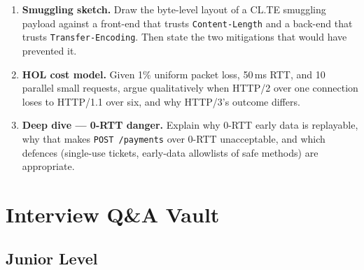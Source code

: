 \begin{enumerate}[label=\textbf{E1.\arabic*}, leftmargin=3.2em]
  \item \textbf{Smuggling sketch.} Draw the byte-level layout of a CL.TE smuggling payload against a front-end that trusts \texttt{Content-Length} and a back-end that trusts \texttt{Transfer-Encoding}. Then state the two mitigations that would have prevented it.
  \item \textbf{HOL cost model.} Given 1\% uniform packet loss, 50\,ms RTT, and 10 parallel small requests, argue qualitatively when HTTP/2 over one connection loses to HTTP/1.1 over six, and why HTTP/3's outcome differs.
  \item \textbf{Deep dive --- 0-RTT danger.} Explain why 0-RTT early data is replayable, why that makes \texttt{POST /payments} over 0-RTT unacceptable, and which defences (single-use tickets, early-data allowlists of safe methods) are appropriate.
\end{enumerate}

\section{Interview Q\&A Vault}

\subsection*{Junior Level}

